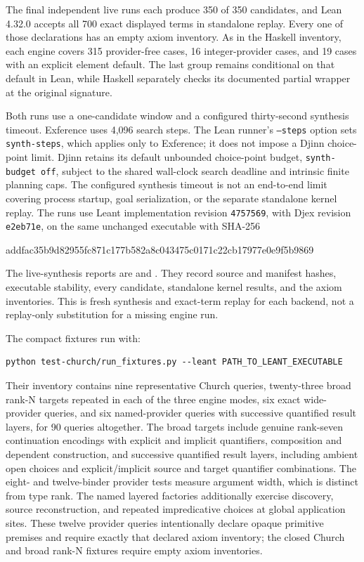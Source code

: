 \documentclass[11pt]{article}
\newcommand{\code}[1]{\texttt{#1}}
\begin{document}
The final independent live runs each produce 350 of 350 candidates, and Lean
4.32.0 accepts all 700 exact displayed terms in standalone replay. Every one
of those declarations has an empty axiom inventory. As in the Haskell inventory, each
engine covers 315 provider-free cases, 16 integer-provider cases, and 19 cases
with an explicit element default. The last group remains conditional on that
default in Lean, while Haskell separately checks its documented partial
wrapper at the original signature.

Both runs use a one-candidate window and a configured thirty-second synthesis
timeout. Exference uses 4,096 search steps. The Lean runner's \code{--steps}
option sets \code{synth-steps}, which applies only to Exference; it does not
impose a Djinn choice-point limit. Djinn retains its default unbounded
choice-point budget, \code{synth-budget off}, subject to the shared wall-clock
search deadline and intrinsic finite planning caps. The configured synthesis
timeout is not an end-to-end limit covering process startup, goal serialization,
or the separate standalone kernel replay.
The runs use Leant implementation revision \code{4757569}, with
Djex revision \code{e2eb71e}, on the same unchanged executable with SHA-256
\begin{center}\small\ttfamily
addfac35b9d82955fc871c177b582a8c043475c0171c22cb17977e0e9f5b9869
\end{center}
The live-synthesis reports are
 and
. They
record source and manifest hashes, executable stability, every candidate,
standalone kernel results, and the axiom inventories. This is fresh synthesis
and exact-term replay for each backend, not a replay-only substitution for a
missing engine run.

The compact fixtures run with:
\begin{lstlisting}
python test-church/run_fixtures.py --leant PATH_TO_LEANT_EXECUTABLE
\end{lstlisting}
Their inventory contains nine representative Church queries, twenty-three broad
rank-N targets repeated in each of the three engine modes, six exact
wide-provider queries, and six named-provider queries with successive
quantified result layers, for 90 queries altogether. The broad targets include genuine
rank-seven continuation encodings with explicit and implicit quantifiers,
composition and dependent construction, and successive quantified result
layers, including ambient open choices and explicit/implicit source and target
quantifier combinations. The eight- and twelve-binder provider tests measure argument width,
which is distinct from type rank. The named layered factories additionally
exercise discovery, source reconstruction, and repeated impredicative choices
at global application sites. These twelve provider queries intentionally
declare opaque primitive premises and require exactly that declared axiom
inventory; the closed Church and broad rank-N fixtures require empty axiom
inventories.
\end{document}
